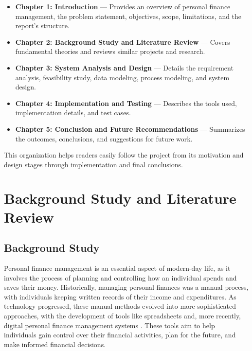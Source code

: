 \documentclass[12pt]{report}
\begin{document}
\begin{itemize}
    \item \textbf{Chapter 1: Introduction} — Provides an overview of personal finance management, the problem statement, objectives, scope, limitations, and the report's structure.
    \item \textbf{Chapter 2: Background Study and Literature Review} — Covers fundamental theories and reviews similar projects and research.
    \item \textbf{Chapter 3: System Analysis and Design} — Details the requirement analysis, feasibility study, data modeling, process modeling, and system design.
    \item \textbf{Chapter 4: Implementation and Testing} — Describes the tools used, implementation details, and test cases.
    \item \textbf{Chapter 5: Conclusion and Future Recommendations} — Summarizes the outcomes, conclusions, and suggestions for future work.
\end{itemize}

\noindent
This organization helps readers easily follow the project from its motivation and design stages through implementation and final conclusions.

\newpage
\chapter{Background Study and Literature Review}

\section{Background Study}
Personal finance management is an essential aspect of modern-day life, as it involves the process of planning and controlling how an individual spends and saves their money. Historically, managing personal finances was a manual process, with individuals keeping written records of their income and expenditures. As technology progressed, these manual methods evolved into more sophisticated approaches, with the development of tools like spreadsheets and, more recently, digital personal finance management systems \cite{chandini2019online, manchanda2012expense}. These tools aim to help individuals gain control over their financial activities, plan for the future, and make informed financial decisions.
\end{document}
